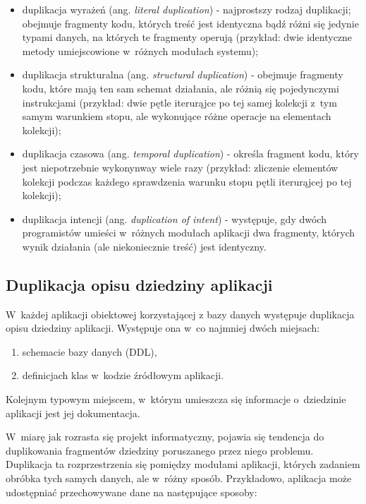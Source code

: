 \begin{itemize}
 \item duplikacja wyrażeń (ang. \emph{literal duplication}) - najprostszy rodzaj duplikacji; obejmuje fragmenty kodu, których treść jest identyczna bądź różni się jedynie typami danych, na których te fragmenty operują (przykład: dwie identyczne metody umiejscowione w~różnych modułach systemu); 
 \item duplikacja strukturalna (ang. \emph{structural duplication}) - obejmuje fragmenty kodu, które mają ten sam schemat działania, ale różnią się pojedynczymi instrukcjami (przykład: dwie pętle iterurąjce po tej samej kolekcji z~tym samym warunkiem stopu, ale wykonujące różne operacje na elementach kolekcji);
 \item duplikacja czasowa (ang. \emph{temporal duplication}) - określa fragment kodu, który jest niepotrzebnie wykonynway wiele razy (przykład: zliczenie elementów kolekcji podczas każdego sprawdzenia warunku stopu pętli iterurąjcej po tej kolekcji);
 \item duplikacja intencji (ang. \emph{duplication of intent}) - występuje, gdy dwóch programistów umieści w~różnych modułach aplikacji dwa fragmenty, których wynik działania (ale niekoniecznie treść) jest identyczny.
\end{itemize}


\subsection{Duplikacja opisu dziedziny aplikacji}

W~każdej aplikacji obiektowej korzystającej z bazy danych występuje duplikacja opisu dziedziny aplikacji.
Występuje ona w~co najmniej dwóch miejsach:

\begin{enumerate}
 \item schemacie bazy danych (DDL),
 \item definicjach klas w~kodzie źródłowym aplikacji.
\end{enumerate}

Kolejnym typowym miejscem, w~którym umieszcza się informacje o~dziedzinie aplikacji jest jej dokumentacja.

W~miarę jak rozrasta się projekt informatyczny, pojawia się tendencja do duplikowania fragmentów dziedziny poruszanego przez niego problemu.
Duplikacja ta rozprzestrzenia się pomiędzy modułami aplikacji, których zadaniem obróbka tych samych danych, ale w~różny sposób.
Przykładowo, aplikacja może udostępniać przechowywane dane na następujące sposoby:

